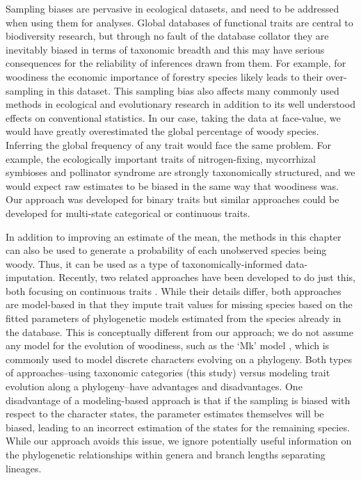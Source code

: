 Sampling biases are pervasive in ecological datasets, and need to be
addressed when using them for analyses.  Global databases of
functional traits \citep[e.g., TRY;][]{kattge2011try} are central to
biodiversity research, but through no fault of the database collator
they are inevitably biased in terms of taxonomic breadth and this may
have serious consequences for the reliability of inferences drawn from
them.  For example, for woodiness the economic importance of forestry
species likely leads to their over-sampling in this dataset.
This sampling bias also affects many commonly used methods in
ecological and evolutionary research
\citep[e.g.,][]{ackerly2000taxon,nakagawa2008missing,PennellHarmon,Pakeman2013}
in addition to its well understood effects on conventional statistics.
In our case, taking the data at face-value, we would have greatly
overestimated the global percentage of woody species.  Inferring the
global frequency of any trait would face the same problem.  For
example, the ecologically important traits of nitrogen-fixing,
mycorrhizal symbioses and pollinator syndrome are strongly
taxonomically structured, and we would expect raw estimates to be
biased in the same way that woodiness was.  Our approach was developed
for binary traits but similar approaches could be developed for
multi-state categorical or continuous traits.

In addition to improving an estimate of the mean, the methods in this
chapter can also be used to generate a probability of each unobserved
species being woody.  Thus, it can be used as a type of taxonomically-informed 
data-imputation.  Recently, two related approaches have
been developed to do just this, both focusing on continuous traits
\citep{Swenson2013, PEM}.  While their details differ, both approaches
are model-based in that they impute trait values for missing species
based on the fitted parameters of phylogenetic models estimated from
the species already in the database. This is conceptually different
from our approach; we do not assume any model for the evolution of
woodiness, such as the `Mk' model \citep{Pagel1994}, which is commonly
used to model discrete characters evolving on a phylogeny. Both types
of approaches--using taxonomic categories (this study) versus
modeling trait evolution along a phylogeny--have advantages and
disadvantages.  One disadvantage of a modeling-based approach is that
if the sampling is biased with respect to the character states, the
parameter estimates themselves will be biased, leading to an incorrect
estimation of the states for the remaining species. While our approach
avoids this issue, we ignore potentially useful information on the
phylogenetic relationships within genera and branch lengths separating
lineages.

